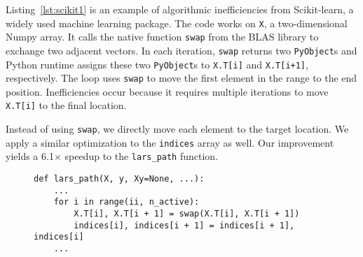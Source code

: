 Listing~\ref{lst:scikit1} is an example of algorithmic inefficiencies from Scikit-learn, a widely used machine learning package. 
The code works on {\tt X}, a two-dimensional Numpy array. It calls the native function {\tt swap} from the BLAS library to exchange two adjacent vectors. In each iteration, {\tt swap} returns two {\tt PyObject}s and Python runtime assigns these two {\tt PyObject}s to {\tt X.T[i]} and {\tt X.T[i+1]}, respectively. The loop uses {\tt swap} to move the first element in the range to the end position. Inefficiencies occur because it requires multiple iterations to move {\tt X.T[i]} to the final location.


Instead of using {\tt swap}, we directly move each element to the target location. We apply a similar optimization to the {\tt indices} array as well. Our improvement yields a  6.1$\times$ speedup to the {\tt lars\_path} function.





\begin{figure}[t]
\begin{lstlisting}[caption={Interaction inefficiencies in Scikit-learn due to the inefficient algorithm.},label=lst:scikit1]
def lars_path(X, y, Xy=None, ...):
    ...
    for i in range(ii, n_active):
        X.T[i], X.T[i + 1] = swap(X.T[i], X.T[i + 1])
        indices[i], indices[i + 1] = indices[i + 1], indices[i]
    ...
\end{lstlisting}
\end{figure}


